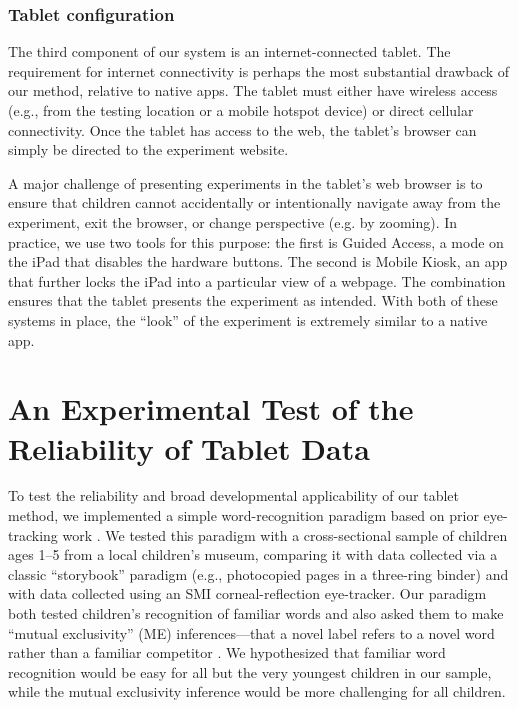 \documentclass[man,noapacite]{apa2}
\begin{document}
\subsubsection{Tablet configuration}

The third component of our system is an internet-connected tablet. The requirement for internet connectivity is perhaps the most substantial drawback of our method, relative to native apps. The tablet must either have wireless access (e.g., from the testing location or a mobile hotspot device) or direct cellular connectivity. Once the tablet has access to the web, the tablet's browser can simply be directed to the experiment website. 

A major challenge of presenting experiments in the tablet's web browser is to ensure that children cannot accidentally or intentionally navigate away from the experiment, exit the browser, or change perspective (e.g. by zooming). In practice, we use two tools for this purpose: the first is Guided Access, a mode on the iPad that disables the hardware buttons. The second is Mobile Kiosk, an app that further locks the iPad into a particular view of a webpage. The combination ensures that the tablet presents the experiment as intended. With both of these systems in place, the ``look'' of the experiment is extremely similar to a native app. 

\section{An Experimental Test of the Reliability of Tablet Data}
 
To test the reliability and broad developmental applicability of our tablet method, we implemented a simple word-recognition paradigm based on prior eye-tracking work \cite{fernald1998,fernald2006,bion2013}. We tested this paradigm with a cross-sectional sample of children ages 1--5 from a local children's museum, comparing it with data collected via a classic ``storybook'' paradigm (e.g., photocopied pages in a three-ring binder) and with data collected using an SMI corneal-reflection eye-tracker. Our paradigm both tested children's recognition of familiar words and also asked them to make ``mutual exclusivity'' (ME) inferences---that a novel label refers to a novel word rather than a familiar competitor \cite{markman1988}. We hypothesized that familiar word recognition would be easy for all but the very youngest children in our sample, while the mutual exclusivity inference would be more challenging for all children.
\end{document}
